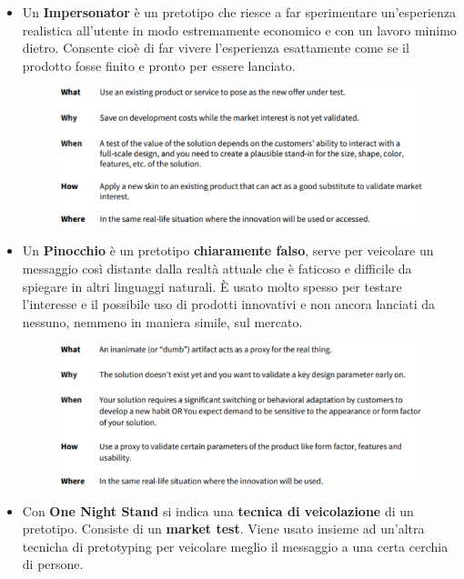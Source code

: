 \documentclass[a4paper,11pt,oneside]{book}
\begin{document}
\begin{itemize}
	\item Un \textbf{Impersonator} è un pretotipo che riesce a far sperimentare un'esperienza realistica all'utente in modo estremamente economico e con un lavoro minimo dietro. Consente cioè di
	      far vivere l'esperienza esattamente come se il prodotto fosse finito e pronto per essere lanciato.

	      \begin{figure}[!h]
		      \centering
		      \includegraphics[scale=0.42]{immagini/Impersonator.png}
	      \end{figure}

	      \pagebreak

	\item Un \textbf{Pinocchio} è un pretotipo \textbf{chiaramente falso}, serve per veicolare un messaggio così distante dalla realtà attuale che è faticoso e difficile da spiegare in altri linguaggi naturali. È usato molto spesso per testare l'interesse e il possibile uso di prodotti innovativi e non ancora lanciati da nessuno, nemmeno in maniera simile, sul mercato.

	      \begin{figure}[!h]
		      \centering
		      \includegraphics[scale=0.5]{immagini/Pinocchio.png}
	      \end{figure}

	\item Con \textbf{One Night Stand} si indica una \textbf{tecnica di veicolazione} di un pretotipo. Consiste di un \textbf{market test}.
	      Viene usato insieme ad un'altra tecnicha di pretotyping per veicolare meglio il messaggio a una certa cerchia di persone.


\end{itemize}
\end{document}
